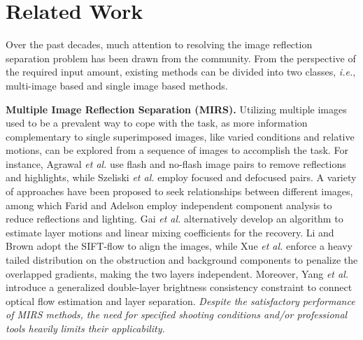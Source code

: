 \documentclass{article}
\begin{document}
\section{Related Work}
\label{sec:RW}
Over the past decades, much attention to resolving the image reflection separation problem has been drawn from the community. From the perspective of the required input amount, existing methods can be divided into two classes, \emph{i.e.}, multi-image based and single image based methods. 

\textbf{Multiple Image Reflection Separation (MIRS).} Utilizing multiple images \cite{DBLP:conf/cvpr/FaridA99,DBLP:journals/ijcv/SchechnerKB00,DBLP:conf/cvpr/SzeliskiAA00,DBLP:conf/eccv/SarelI04,DBLP:journals/tog/AgrawalRNL05,DBLP:journals/pami/GaiSZ12,DBLP:journals/tog/SinhaKGSS12,DBLP:conf/iccv/LiB13,DBLP:conf/cvpr/GuoCM14,DBLP:conf/cvpr/SimonP15,DBLP:journals/tog/Freeman15,DBLP:conf/mm/SunLYZWL16,DBLP:conf/cvpr/YangLDT16,DBLP:conf/cvpr/HanS17} used to be a prevalent way to cope with the task, as more information complementary to single superimposed images, like varied conditions and relative motions, can be explored from a sequence of images to accomplish the task. For instance, Agrawal \emph{et al.} \cite{DBLP:journals/tog/AgrawalRNL05} use flash and no-flash image pairs to remove reflections and highlights, while Szeliski \emph{et al.} \cite{DBLP:conf/cvpr/SzeliskiAA00} employ focused and defocused pairs. A variety of approaches \cite{DBLP:conf/cvpr/FaridA99, DBLP:conf/eccv/SarelI04,DBLP:journals/pami/GaiSZ12,DBLP:conf/iccv/LiB13,DBLP:conf/cvpr/SzeliskiAA00,DBLP:journals/tog/Freeman15,DBLP:conf/cvpr/YangLDT16} have been proposed to seek relationships between different images, among which Farid and Adelson \cite{DBLP:conf/cvpr/FaridA99} employ independent component analysis to reduce reflections and lighting. Gai \emph{et al.} \cite{DBLP:journals/pami/GaiSZ12} alternatively develop an algorithm to estimate layer motions and linear mixing coefficients for the recovery. Li and Brown \cite{DBLP:conf/iccv/LiB13} adopt the SIFT-flow to align the images, while Xue \emph{et al.} \cite{DBLP:journals/tog/Freeman15} enforce a heavy tailed distribution on the obstruction and background components to penalize the overlapped gradients, making the two layers independent. Moreover, Yang \emph{et al.} \cite{DBLP:conf/cvpr/YangLDT16} introduce a generalized double-layer brightness consistency constraint to connect optical flow estimation and layer separation.
\emph{Despite the satisfactory performance of MIRS methods, the need for specified shooting conditions and/or professional tools heavily limits their applicability.} 
\end{document}
